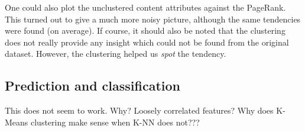 One could also plot the unclustered content attributes against the PageRank. This turned out to give a much more noisy picture, although the same tendencies were found (on average). If course, it should also be noted that the clustering does not really provide any insight which could not be found from the original dataset. However, the clustering helped us \textit{spot} the tendency.

\subsection{Prediction and classification}
\label{subsec:predictclassify}

This does not seem to work. Why? Loosely correlated features? Why does K-Means clustering make sense when K-NN does not???